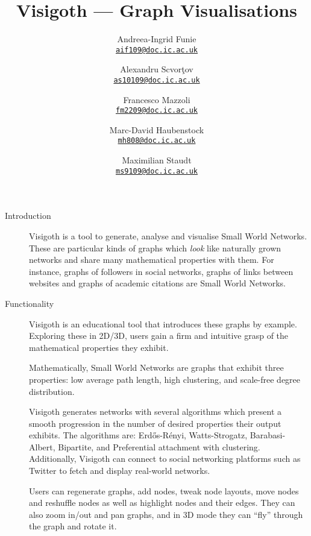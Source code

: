 \documentclass[a4paper,11pt]{article}
\let\stdhref\href
\renewcommand{\href}[2]{\stdhref{#1}{\texttt{#2}}}
\newcommand{\mailto}[1]{\href{mailto:#1}{#1}}
\begin{document}
\title{Visigoth --- Graph Visualisations}
\author{
  Andreea-Ingrid Funie\\\mailto{aif109@doc.ic.ac.uk}\and
  Alexandru Scvor\c tov\\\mailto{as10109@doc.ic.ac.uk}\and
  Francesco Mazzoli\\\mailto{fm2209@doc.ic.ac.uk}\and
  Marc-David Haubenstock\\\mailto{mh808@doc.ic.ac.uk}\and
  Maximilian Staudt\\\mailto{ms9109@doc.ic.ac.uk}
}
\date{}
\maketitle

\begin{description}
\item[Introduction]

  Visigoth is a tool to generate, analyse and visualise Small World
  Networks. These are particular kinds of graphs which \emph{look}
  like naturally grown networks and share many mathematical properties
  with them.  For instance, graphs of followers in social networks,
  graphs of links between websites and graphs of academic citations
  are Small World Networks.

  \item[Functionality]

  Visigoth is an educational tool that introduces these graphs by
  example.  Exploring these in 2D/3D, users gain a firm and intuitive
  grasp of the mathematical properties they exhibit.

  Mathematically, Small World Networks are graphs that exhibit three
  properties: low average path length, high clustering, and scale-free
  degree distribution.

  Visigoth generates networks with several algorithms which present a
  smooth progression in the number of desired properties their output
  exhibits. The algorithms are: Erd\H{o}s-R\'{e}nyi, Watts-Strogatz,
  Barabasi-Albert, Bipartite, and Preferential attachment with
  clustering. Additionally, Visigoth can connect to social networking
  platforms such as Twitter to fetch and display real-world networks.

  Users can regenerate graphs, add nodes, tweak node layouts, move
  nodes and reshuffle nodes as well as highlight nodes and their
  edges. They can also zoom in/out and pan graphs, and in 3D mode
  they can ``fly'' through the graph and rotate it.


\end{description}
\end{document}
